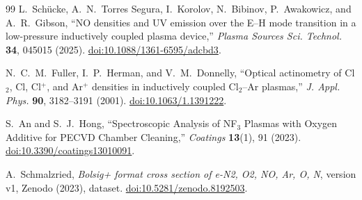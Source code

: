 \begin{thebibliography}{99}
L.~Schücke, A.~N.~Torres Segura, I.~Korolov, N.~Bibinov,
P.~Awakowicz, and A.~R.~Gibson,
``NO densities and UV emission over the E--H mode transition in a low-pressure inductively coupled plasma device,''
\textit{Plasma Sources Sci. Technol.} \textbf{34}, 045015 (2025).
\href{https://doi.org/10.1088/1361-6595/adcbd3}{doi:10.1088/1361-6595/adcbd3}.

N.~C.~M.~Fuller, I.~P.~Herman, and V.~M.~Donnelly,
``Optical actinometry of Cl$_2$, Cl, Cl$^+$, and Ar$^+$ densities in inductively coupled Cl$_2$--Ar plasmas,''
\textit{J. Appl. Phys.} \textbf{90}, 3182--3191 (2001).
\href{https://doi.org/10.1063/1.1391222}{doi:10.1063/1.1391222}.

S.~An and S.~J.~Hong,
``Spectroscopic Analysis of NF$_3$ Plasmas with Oxygen Additive for PECVD Chamber Cleaning,''
\textit{Coatings} \textbf{13}(1), 91 (2023).
\href{https://doi.org/10.3390/coatings13010091}{doi:10.3390/coatings13010091}.

A.~Schmalzried,
\textit{Bolsig+ format cross section of e-N2, O2, NO, Ar, O, N},
version v1, Zenodo (2023), dataset.
\href{https://doi.org/10.5281/zenodo.8192503}{doi:10.5281/zenodo.8192503}.

\end{thebibliography}
\endgroup
